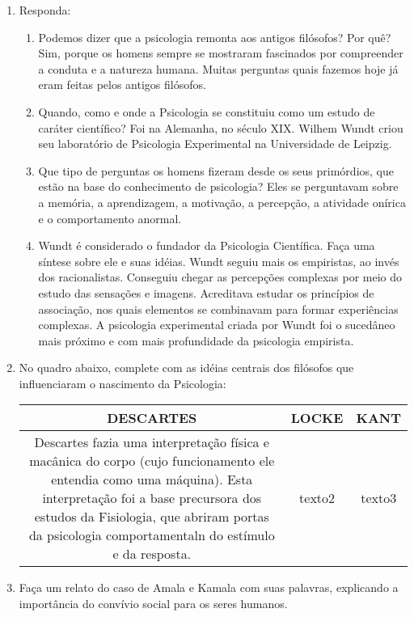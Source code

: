 \documentclass[a4paper, 12pt]{article}
\begin{document}
\begin{enumerate}
  
\item Responda: 
  \begin{enumerate}
  \item Podemos dizer que a psicologia remonta aos antigos filósofos? Por quê? \newline \newline
    Sim, porque os homens sempre se mostraram fascinados por compreender a conduta e a natureza humana. Muitas perguntas quais fazemos hoje já eram feitas pelos antigos filósofos. \newline
  \item Quando, como e onde a Psicologia se constituiu como um estudo de caráter científico? \newline \newline
  Foi na Alemanha, no século XIX. Wilhem Wundt criou seu laboratório de Psicologia Experimental na Universidade de Leipzig. \newline 
  \item Que tipo de perguntas os homens fizeram desde os seus primórdios, que estão na base do conhecimento de psicologia? \newline \newline
  Eles se perguntavam sobre a memória, a aprendizagem, a motivação, a percepção, a atividade onírica e o comportamento anormal. \newline
  \item Wundt é considerado o fundador da Psicologia Científica. Faça uma síntese sobre ele e suas idéias. \newline \newline
    Wundt seguiu mais os empiristas, ao invés dos racionalistas. Conseguiu chegar as percepções complexas por meio do estudo das sensações e imagens. Acreditava estudar os princípios de associação, nos quais elementos se combinavam para formar experiências complexas. A psicologia experimental criada por Wundt foi o sucedâneo mais próximo e com mais profundidade da psicologia empirista.
    \newline
  \end{enumerate}

\item No quadro abaixo, complete com as idéias centrais dos filósofos que influenciaram o nascimento da Psicologia: \newline \newline
  \centering
  \begin{tabular}{| c{2cm} | c{2cm} | c{2cm} |}
    \hline
    \textbf{DESCARTES} & \textbf{LOCKE} & \textbf{KANT} \\ \hline
    Descartes fazia uma interpretação física e macânica do corpo (cujo funcionamento ele entendia como uma máquina). Esta interpretação foi a base precursora dos estudos da Fisiologia, que abriram portas  da psicologia comportamentaln do estímulo e da resposta. & texto2 & texto3 \\ \hline
  \end{tabular} \newline
  
\item Faça um relato do caso de Amala e Kamala com suas palavras, explicando a importância do convívio social para os seres humanos.
\end{enumerate}
\end{document}
